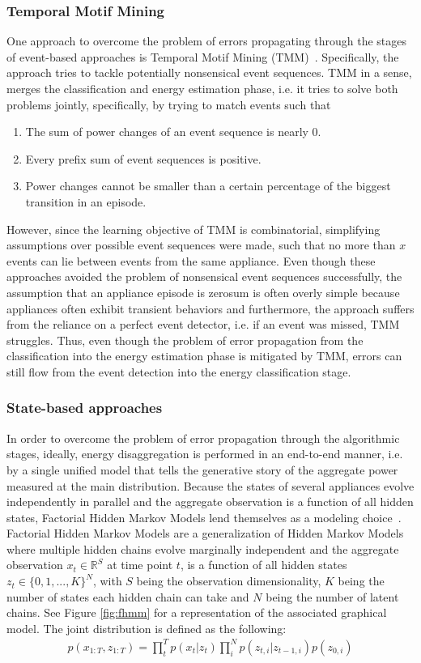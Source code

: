 \documentclass[11pt]{cmuthesis} %
\begin{document}
\subsubsection{Temporal Motif Mining}
One approach to overcome the problem of errors propagating through the stages of event-based approaches is Temporal Motif Mining (TMM)~\cite{shao2012temporal}. Specifically, the approach tries to tackle potentially nonsensical event sequences. TMM in a sense, merges the classification and energy estimation phase, i.e. it tries to solve both problems jointly, specifically, by trying to match events such that 
\begin{enumerate}
\item The sum of power changes of an event sequence is nearly 0.
\item Every prefix sum of event sequences is positive.
\item Power changes cannot be smaller than a certain percentage of the biggest transition in an episode.
\end{enumerate}
However, since the learning objective of TMM is combinatorial, simplifying assumptions over possible event sequences were made, such that no more than $x$ events can lie between events from the same appliance. Even though these approaches avoided the problem of nonsensical event sequences successfully, the assumption that an appliance episode is zerosum is often overly simple because appliances often exhibit transient behaviors and furthermore, the approach suffers from the reliance on a perfect event detector, i.e. if an event was missed, TMM struggles. Thus, even though the problem of error propagation from the classification into the energy estimation phase is mitigated by TMM, errors can still flow from the event detection into the energy classification stage.

\subsubsection{State-based approaches}
In order to overcome the problem of error propagation through the algorithmic stages, ideally, energy disaggregation is performed in an end-to-end manner, i.e. by a single unified model that tells the generative story of the aggregate power measured at the main distribution. Because the states of several appliances evolve independently in parallel and the aggregate observation is a function of all hidden states, Factorial Hidden Markov Models lend themselves as a modeling choice~\cite{ghahramani1996factorial}. Factorial Hidden Markov Models are a generalization of Hidden Markov Models where multiple hidden chains evolve marginally independent and the aggregate observation $x_t \in \mathbb{R}^S$ at time point $t$, is a function of all hidden states $z_t \in \{0,1, ..., K\}^N$, with $S$ being the observation dimensionality, $K$ being the number of states each hidden chain can take and $N$ being the number of latent chains. See Figure \ref{fig:fhmm} for a representation of the associated graphical model. The joint distribution is defined as the following:
\begin{align}
p(x_{1:T},z_{1:T}) = \prod_t^T p(x_t|z_t)\prod_i^N p(z_{t,i}|z_{t-1,i})p(z_{0,i})
\end{align}
\end{document}
